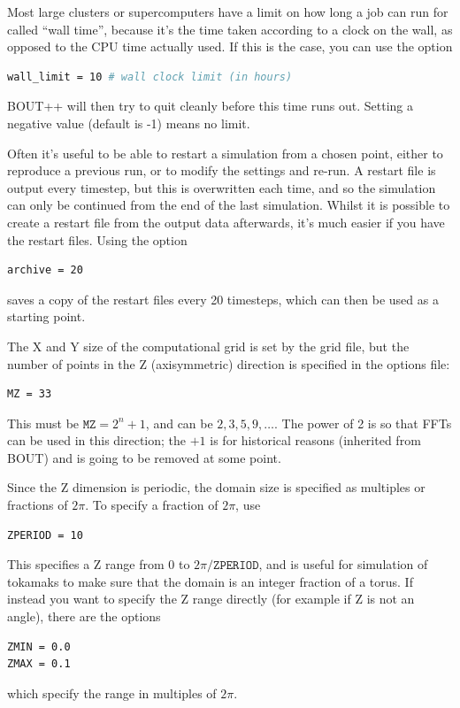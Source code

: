 \documentclass[12pt]{article}
\newcommand{\code}[1]{\texttt{#1}}
\begin{document}
Most large clusters or supercomputers have a limit on how long a job can
run for called ``wall time'', because it's the time taken according to a
clock on the wall, as opposed to the CPU time actually used.
If this is the case, you can use the option
\begin{lstlisting}[language=bash,numbers=none]
wall_limit = 10 # wall clock limit (in hours)
\end{lstlisting}
BOUT++ will then try to quit cleanly before this time runs out. Setting a
negative value (default is -1) means no limit.

Often it's useful to be able to restart a simulation from a chosen point,
either to reproduce a previous run, or to modify the settings and re-run.
A restart file is output every timestep, but this is overwritten each time,
and so the simulation can only be continued from the end of the last
simulation. Whilst it is possible to create a restart file from the output
data afterwards, it's much easier if you have the restart files. Using the
option
\begin{lstlisting}[language=bash,numbers=none]
archive = 20
\end{lstlisting}
saves a copy of the restart files every 20 timesteps, which can then be used as a starting point.

The X and Y size of the computational grid is set by the grid file, but the
number of points in the Z (axisymmetric) direction is specified in the options
file:
\begin{lstlisting}[language=bash,numbers=none]
MZ = 33
\end{lstlisting}
This must be $\texttt{MZ} = 2^n + 1$, and can be $2,3,5,9,\ldots$. The power of 2 is so
that FFTs can be used in this direction; the $+1$ is for historical reasons (inherited from BOUT)
and is going to be removed at some point.

Since the Z dimension is periodic, the domain size is specified as multiples or fractions of $2\pi$.
To specify a fraction of $2\pi$, use
\begin{lstlisting}[language=bash,numbers=none]
ZPERIOD = 10
\end{lstlisting}
This specifies a Z range from $0$ to $2\pi / \code{ZPERIOD}$, and is useful for simulation
of tokamaks to make sure that the domain is an integer fraction of a torus. If instead you want
to specify the Z range directly (for example if Z is not an angle), there are the options
\begin{lstlisting}[language=bash,numbers=none]
ZMIN = 0.0
ZMAX = 0.1
\end{lstlisting}
which specify the range in multiples of $2\pi$.
\end{document}
